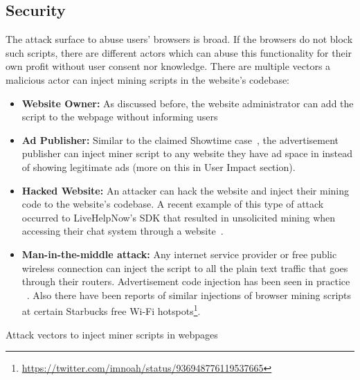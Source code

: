 \subsection{\textbf{Security}}
The attack surface to abuse users' browsers is broad. If the browsers do not block such scripts, there are different actors which can abuse this functionality for their own profit without user consent nor knowledge. There are multiple vectors a malicious actor can inject mining scripts in the website's codebase:
\begin{itemize}
\item \textbf{Website Owner:} As discussed before, the website administrator can add the script to the webpage without informing users
\item \textbf{Ad Publisher:} Similar to the claimed Showtime case~\cite{showtimehive}, the advertisement publisher can inject miner script to any website they have ad space in instead of showing legitimate ads (more on this in User Impact section).
\item \textbf{Hacked Website:} An attacker can hack the website and inject their mining code to the website's codebase. A recent example of this type of attack occurred to LiveHelpNow's SDK that resulted in unsolicited mining when accessing their chat system through a website~\cite{chatsupporthack}.
\item \textbf{Man-in-the-middle attack:} Any internet service provider or free public wireless connection can inject the script to all the plain text traffic that goes through their routers. Advertisement code injection has been seen in practice ~\cite{vergeadinjection}. Also there have been reports of similar injections of browser mining scripts at certain Starbucks free Wi-Fi hotspots\footnote{\url{https://twitter.com/imnoah/status/936948776119537665}}.
\end{itemize}

\begin{center}
	\caption{Attack vectors to inject miner scripts in webpages}
\end{center}

